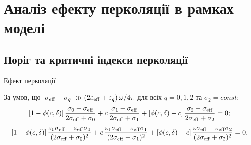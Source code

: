\documentclass[10pt]{beamer}
\begin{document}
\section{Аналіз ефекту перколяції в рамках моделі}%
\subsection{Поріг та критичні індекси перколяції}

\begin{frame}{Ефект перколяції}
\footnotesize

За умов, що  $|\sigma_{\rm eff}-\sigma_{ q}|  \gg  
\left(2\varepsilon_{\rm eff} +\varepsilon_q \right) \omega/4\pi$ для всіх $q=0,1,2$ та $\sigma_2 = const$:
\begin{eqnarray*}
\left[1-\phi(c, \delta)\right]\frac{\sigma_0 -\sigma_{\rm
eff}}{2\sigma_{\rm eff}+\sigma_0} + c\,\frac{\sigma_1 -\sigma_{\rm
eff}}{2\sigma_{\rm eff}+\sigma_1} 
+\left[\phi(c, \delta)-c\right]\frac{\sigma_2 -\sigma_{\rm
eff}}{2\sigma_{\rm eff}+\sigma_2}=0;
\end{eqnarray*}
$$
    \left[1-\phi(c, \delta)\right] \frac{\varepsilon_0\sigma_{\rm eff} - \varepsilon_{\rm eff}\sigma_0}{(2\sigma_{\rm eff}+\sigma_0)^2} + c\,\frac{\varepsilon_1\sigma_{\rm eff} -\varepsilon_{\rm eff}\sigma_1}{(2\sigma_{\rm eff}+\sigma_1)^2} 
    +\left[\phi(c, \delta)-c\right]\frac{\varepsilon\sigma_{\rm eff} - \varepsilon_{\rm eff} \sigma_2}{(2\sigma_{\rm eff}+\sigma_2)^2}=0.
$$


\end{frame}
\end{document}
